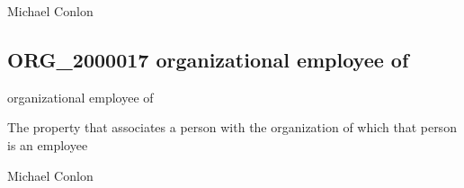 \documentclass[letterpaper,10pt,english]{sphinxmanual}
\begin{document}
\begin{sphinxShadowBox}

\sphinxAtStartPar
Michael Conlon 
\end{sphinxShadowBox}
\begin{quote}

\ignorespaces \end{quote}


\subsection{ORG\_2000017 \sphinxhyphen{} organizational employee of}
\label{\detokenize{doc-ORG_2000017:org-2000017-organizational-employee-of}}\label{\detokenize{doc-ORG_2000017:index-0}}\label{\detokenize{doc-ORG_2000017::doc}}
\begin{sphinxShadowBox}

\sphinxAtStartPar
organizational employee of
\end{sphinxShadowBox}

\begin{sphinxShadowBox}

\sphinxAtStartPar
{}
\end{sphinxShadowBox}

\begin{sphinxShadowBox}

\sphinxAtStartPar
The property that associates a person with the organization of which that person is an employee
\end{sphinxShadowBox}

\begin{sphinxShadowBox}

\sphinxAtStartPar
Michael Conlon 
\end{sphinxShadowBox}

\begin{sphinxShadowBox}

\sphinxAtStartPar
{\hyperref[\detokenize{doc-NCBITaxon_9606::doc}]{}}
\end{sphinxShadowBox}
\end{document}
